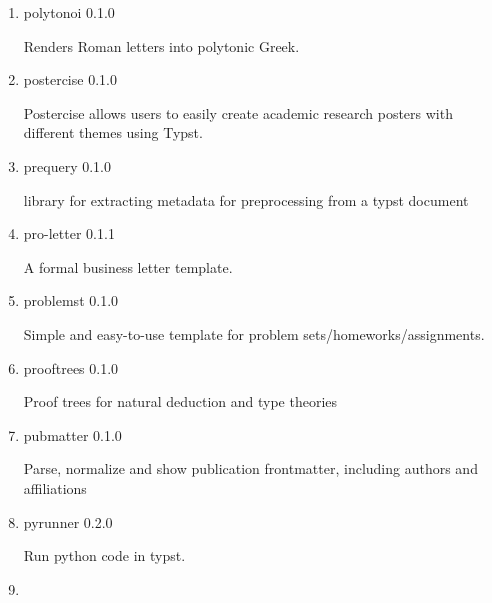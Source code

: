\begin{enumerate}
  { pointless-size } { 0.1.0 }

  ä¸­æ--‡å­---å?·çš„å?·æ•°åˆ¶å?Šå­---ä½``åº¦é‡?å?•ä½? Chinese size system
  (hÃ~o-system) and type-related measurements units
\item
  \href{/universe/package/polytonoi/}{}

  { polytonoi } { 0.1.0 }

  Renders Roman letters into polytonic Greek.
\item
  \href{/universe/package/postercise/}{}

  { postercise } { 0.1.0 }

  Postercise allows users to easily create academic research posters
  with different themes using Typst.
\item
  \href{/universe/package/prequery/}{}

  { prequery } { 0.1.0 }

  library for extracting metadata for preprocessing from a typst
  document
\item
  \href{/universe/package/pro-letter/}{}


  { pro-letter } { 0.1.1 }

  A formal business letter template.
\item
  \href{/universe/package/problemst/}{}


  { problemst } { 0.1.0 }

  Simple and easy-to-use template for problem
  sets/homeworks/assignments.
\item
  \href{/universe/package/prooftrees/}{}

  { prooftrees } { 0.1.0 }

  Proof trees for natural deduction and type theories
\item
  \href{/universe/package/pubmatter/}{}

  { pubmatter } { 0.1.0 }

  Parse, normalize and show publication frontmatter, including authors
  and affiliations
\item
  \href{/universe/package/pyrunner/}{}

  { pyrunner } { 0.2.0 }

  Run python code in typst.
\item
  \href{/universe/package/qcm/}{}


\end{enumerate}

